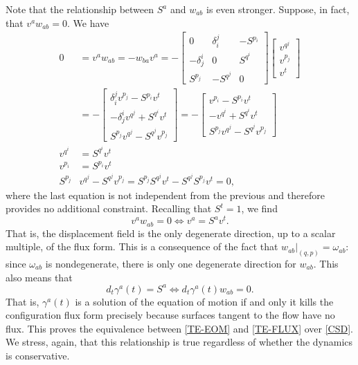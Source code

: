\documentclass[nofootinbib,aps,pre]{revtex4-2}
\begin{document}
Note that the relationship between $S^a$ and $w_{ab}$ is even stronger. Suppose, in fact, that $v^a w_{ab} = 0$. We have
\begin{equation}
    \begin{aligned}
        0 &= v^a w_{ab} = - w_{ba} v^a = - \begin{bmatrix}
            0 & \delta_i^j & -S^{p_i} \\
            -\delta_j^i & 0 & S^{q^i} \\
            S^{p_j} & -S^{q^j} & 0
        \end{bmatrix} \begin{bmatrix}
            v^{q^j} \\ v^{p_j} \\ v^{t} 
        \end{bmatrix} \\
        &= - \begin{bmatrix}
            \delta_i^j v^{p_j} -S^{p_i} v^t  \\ -\delta_j^i v^{q^j} + S^{q^i} v^t \\ S^{p_j}v^{q^j} -S^{q^j}v^{p_j} 
        \end{bmatrix} = - \begin{bmatrix}
            v^{p_i} -S^{p_i} v^t  \\
            - v^{q^i} + S^{q^i} v^t \\
            S^{p_j}v^{q^j} -S^{q^j}v^{p_j} 
        \end{bmatrix} \\
        v^{q^i} &= S^{q^i} v^t \\
        v^{p_i} &= S^{p_i} v^t \\
        S^{p_j}&v^{q^j} -S^{q^j}v^{p_j} = S^{p_j}S^{q^j} v^t -S^{q^j}S^{p_j} v^t = 0,
    \end{aligned}
\end{equation}
where the last equation is not independent from the previous and therefore provides no additional constraint. Recalling that $S^t = 1$, we find
\begin{equation}
    v^a w_{ab} = 0 \iff v^a = S^a v^t.
\end{equation}
That is, the displacement field is the only degenerate direction, up to a scalar multiple, of the flux form. This is a consequence of the fact that $w_{ab}|_{(q,p)} = \omega_{ab}$: since $\omega_{ab}$ is nondegenerate, there is only one degenerate direction for $w_{ab}$. This also means that
\begin{equation}\label{evolutionsKillFlux}
    d_t \gamma^a(t) = S^a  \iff d_t \gamma^a(t) w_{ab} = 0.
\end{equation}
That is, $\gamma^a(t)$ is a solution of the equation of motion if and only it kills the configuration flux form precisely because surfaces tangent to the flow have no flux. This proves the equivalence between \ref{TE-EOM} and \ref{TE-FLUX} over \ref{CSD}. We stress, again, that this relationship is true regardless of whether the dynamics is conservative.
\end{document}

